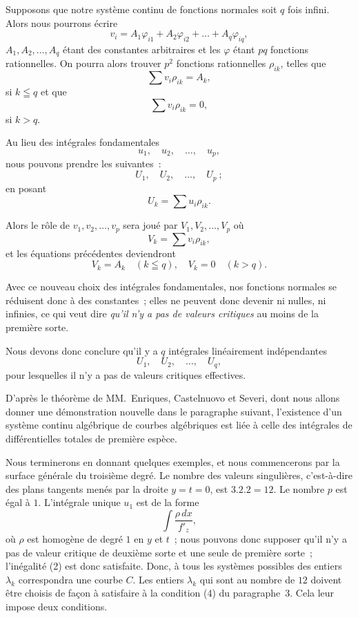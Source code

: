 \documentclass{article}
\begin{document}
Supposons que notre système continu de fonctions normales soit $q$ fois infini. Alors nous pourrons écrire
\[
v_{i} = A_{1} \varphi_{i1} + A_{2} \varphi_{i2} + \ldots + A_{q} \varphi_{iq},
\]
$A_{1}, A_{2}, \ldots, A_{q}$ étant des constantes arbitraires et les $\varphi$ étant $pq$ fonctions
rationnelles. On pourra alors trouver $p^{2}$ fonctions rationnelles $\rho_{ik}$, telles que
\[
\sum v_{i} \rho_{ik} = A_{k},
\]
si $k \leqq q$ et que
\[
\sum v_{i} \rho_{ik} = 0,
\]
si $k > q$.

Au lieu des intégrales fondamentales
\[
u_{1}, \quad u_{2}, \quad \ldots, \quad u_{p},
\]
nous pouvons prendre les suivantes~:
\[
U_{1}, \quad U_{2}, \quad \ldots, \quad U_{p}~;
\]
en posant
\[
U_{k} = \sum u_{i} \rho_{ik}.
\]

Alors le rôle de $v_{1}, v_{2}, \ldots, v_{p}$ sera joué par $V_{1}, V_{2}, \ldots, V_{p}$ où
\[
V_{k} = \sum v_{i} \rho_{ik},
\]
et les équations précédentes deviendront
\[
V_{k} = A_{k} \quad (k \leqq q), \quad V_{k} = 0 \quad (k > q).
\]

Avec ce nouveau choix des intégrales fondamentales, nos fonctions normales se réduisent donc à des constantes~; elles ne peuvent donc devenir ni nulles, ni infinies, ce qui veut dire \emph{qu'il n'y a pas de valeurs critiques} au moins de la première sorte.

Nous devons donc conclure qu'il y a $q$ intégrales linéairement indépendantes
\[
U_{1}, \quad U_{2}, \quad \ldots, \quad U_{q},
\]
pour lesquelles il n'y a pas de valeurs critiques effectives.

D'après le théorème de MM.~Enriques, Castelnuovo et Severi, dont nous allons donner une démonstration nouvelle dans le paragraphe suivant, l'existence d'un système continu algébrique de courbes algébriques
est liée à celle des intégrales de différentielles totales de première espèce.

Nous terminerons en donnant quelques exemples, et nous commencerons par la surface générale du troisième degré. Le nombre des valeurs singulières, c'est-à-dire des plans tangents menés par la droite $y = t = 0$, est $3.2.2 = 12$. Le nombre $p$ est égal à $1$. L'intégrale unique $u_{1}$ est de la forme
\[
\int \frac{\rho \,dx}{f'_{z}},
\]
où $\rho$ est homogène de degré $1$ en $y$ et $t$~; nous pouvons donc supposer qu'il n'y a pas de valeur critique de deuxième sorte et une seule de première sorte~; l'inégalité (2) est donc satisfaite. Donc, à tous les systèmes possibles des entiers $\lambda_{k}$ correspondra une courbe $C$. Les entiers $\lambda_{k}$ qui sont au nombre de $12$ doivent être choisis de façon à satisfaire à la condition (4) du paragraphe~3. Cela leur impose deux conditions.
\end{document}
